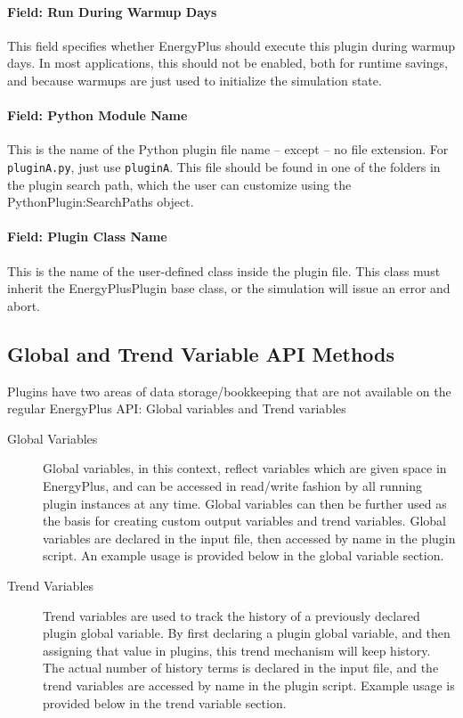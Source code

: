 \paragraph{Field: Run During Warmup Days}

This field specifies whether EnergyPlus should execute this plugin during warmup days.
In most applications, this should not be enabled, both for runtime savings, and because warmups are just used to initialize the simulation state.

\paragraph{Field: Python Module Name}

This is the name of the Python plugin file name -- except -- no file extension.
For \verb=pluginA.py=, just use \verb=pluginA=.
This file should be found in one of the folders in the plugin search path, which the user can customize using the PythonPlugin:SearchPaths object.

\paragraph{Field: Plugin Class Name}

This is the name of the user-defined class inside the plugin file.
This class must inherit the EnergyPlusPlugin base class, or the simulation will issue an error and abort.

\subsection{Global and Trend Variable API Methods}

Plugins have two areas of data storage/bookkeeping that are not available on the regular EnergyPlus API: Global variables and Trend variables

\begin{description}
    \item[Global Variables] Global variables, in this context, reflect variables which are given space in EnergyPlus, and can be accessed in read/write fashion by all running plugin instances at any time.
    Global variables can then be further used as the basis for creating custom output variables and trend variables.
    Global variables are declared in the input file, then accessed by name in the plugin script.
    An example usage is provided below in the global variable section.
    \item[Trend Variables] Trend variables are used to track the history of a previously declared plugin global variable.
    By first declaring a plugin global variable, and then assigning that value in plugins, this trend mechanism will keep history.
    The actual number of history terms is declared in the input file, and the trend variables are accessed by name in the plugin script.
    Example usage is provided below in the trend variable section.
\end{description}

